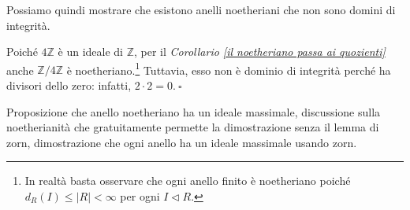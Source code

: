 \noindent Possiamo quindi mostrare che esistono anelli noetheriani che non sono domini di integrità.

\begin{exm}
  Poiché $4\mathbb{Z}$ è un ideale di $\mathbb{Z}$, per il \emph{Corollario \ref{il noetheriano passa ai quozienti}} 
  anche $\mathbb{Z}/4\mathbb{Z}$ è noetheriano.\footnote{In realtà basta osservare che ogni anello finito è noetheriano 
  poiché $d_R(I)\leq |R|<\infty$ per ogni $I\lhd R$.} 
  Tuttavia, esso non è dominio di integrità perché ha divisori dello zero: infatti, $2\cdot 2=0. \ \square$
\end{exm}

\noindent Proposizione che anello noetheriano ha un ideale massimale, discussione sulla noetherianità che gratuitamente 
permette la dimostrazione senza il lemma di zorn, dimostrazione che ogni anello ha un ideale massimale usando zorn.
